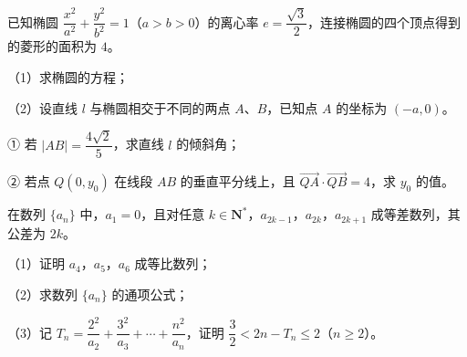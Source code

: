 \begin{question}
已知椭圆 $\dfrac{x^2}{a^2}+\dfrac{y^2}{b^2}=1$（$a>b>0$）的离心率 $e=\dfrac{\sqrt3}2$，连接椭圆的四个顶点得到的菱形的面积为 $4$。

（1）求椭圆的方程；

（2）设直线 $l$ 与椭圆相交于不同的两点 $A$、$B$，已知点 $A$ 的坐标为 $(-a,0)$。

① 若 $|AB|=\dfrac{4\sqrt2}5$，求直线 $l$ 的倾斜角；

② 若点 $Q(0,y_0)$ 在线段 $AB$ 的垂直平分线上，且 $\overrightarrow{QA}\cdot\overrightarrow{QB}=4$，求 $y_0$ 的值。

\end{question}
\begin{question}
在数列 $\{a_n\}$ 中，$a_1=0$，且对任意 $k\in\mathbf N^*$，$a_{2k-1}$，$a_{2k}$，$a_{2k+1}$ 成等差数列，其公差为 $2k$。

（1）证明 $a_4$，$a_5$，$a_6$ 成等比数列；

（2）求数列 $\{a_n\}$ 的通项公式；

（3）记 $T_n=\dfrac{2^2}{a_2}+\dfrac{3^2}{a_3}+\cdots+\dfrac{n^2}{a_n}$，证明 $\dfrac32<2n-T_n\leqslant2$（$n\geqslant2$）。

\end{question}